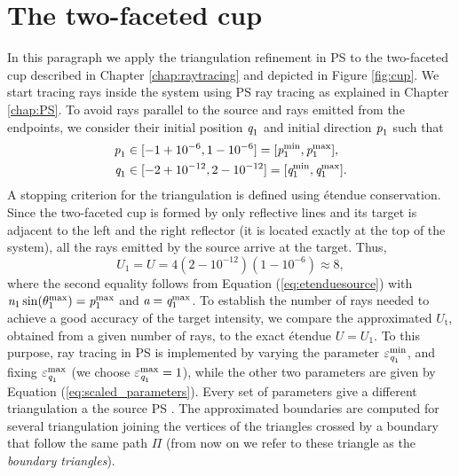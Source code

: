 \section{The two-faceted cup}
In this paragraph we apply the triangulation refinement in PS to the two-faceted cup described in Chapter \ref{chap:raytracing} and depicted in Figure \ref{fig:cup}. 
We start tracing rays inside the system using PS ray tracing as explained in Chapter \ref{chap:PS}. To avoid rays parallel to the source and rays emitted from the endpoints, we consider their initial position $\textit{q}_1$ and initial direction $\textit{p}_1$ such that 
\begin{equation*}
\begin{aligned}
\textit{p}_1&\in[-1+10^{-6},1-10^{-6}] = [\textit{p}_1^{\textrm{min}}, \textit{p}_1^{\textrm{max}}], \\ 
\textit{q}_1&\in[-2+10^{-12}, 2-10^{-12}] = [\textit{q}_1^{\textrm{min}}, \textit{q}_1^{\textrm{max}}].
\end{aligned}
\end{equation*} 
A stopping criterion for the triangulation is defined using \'{e}tendue conservation. Since the two-faceted cup is formed by only reflective lines and its target is adjacent to the left and the right reflector (it is located exactly at the top of the system),  all the rays emitted by the source arrive at the target. Thus, 
\begin{equation}U_1 = U = 4(2-10^{-12})(1-10^{-6})\approx 8, \end{equation}
where the second equality follows from Equation (\ref{eq:etenduesource}) with $\textit{n}_1\sin(\theta_1^{\textrm{max}})=\textit{p}_1^\textrm{max}$ and $\textit{a}=\textit{q}_1^{\textrm{max}}$. To establish the number of rays needed to achieve a good accuracy of the target intensity, we compare the approximated $U_{\textrm{t}}$, obtained from a given number of rays, to the exact \'{e}tendue $U=U_1$. 
To this purpose, ray tracing in PS is implemented by varying the parameter $\varepsilon_{\textit{q}_1}^{\textrm{min}}$, and fixing  $\varepsilon_{\textit{q}_1}^{\textrm{max}}$ (we choose $\varepsilon_{\textit{q}_1}^{\textrm{max}}=1$), while the other two parameters are given by Equation (\ref{eq:scaled_parameters}).
Every set of parameters give a different triangulation a the source PS . The approximated boundaries are computed for several triangulation joining the vertices of the triangles crossed by a boundary that follow the same path $\Pi$ (from now on we refer to these triangle as the \textit{boundary triangles}). 
